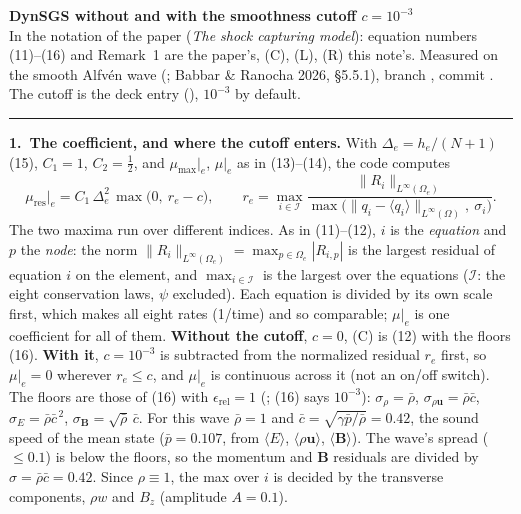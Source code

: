 \documentclass[10pt]{article}
\newcommand{\vv}{\bm{u}}
\newcommand{\BB}{\bm{B}}
\newcommand{\Linf}[2]{\lVert #1\rVert_{L^\infty(#2)}}
\newcommand{\avg}[1]{\langle #1\rangle}
\newcommand{\Ic}{\mathcal{I}}
\newcommand{\erel}{\epsilon_{\mathrm{rel}}}
\newcommand{\mres}{\mu_{\mathrm{res}}\big|_e}
\begin{document}
{\Large\bfseries DynSGS without and with the smoothness cutoff $c=10^{-3}$}\\[2pt]
{\small In the notation of the paper (\emph{The shock capturing model}): equation numbers (11)--(16) and Remark~1 are the
paper's, (C), (L), (R) this note's. Measured on the smooth Alfv\'en wave (;
Babbar \& Ranocha 2026, \S5.5.1), branch \branch{}, commit . The cutoff is the deck entry 
(), $10^{-3}$ by default.}

\vspace{-2pt}\noindent\rule{\textwidth}{0.4pt}

\textbf{1.\ The coefficient, and where the cutoff enters.}
With $\Delta_e=h_e/(N+1)$ (15), $C_1=1$, $C_2=\tfrac12$, and $\mu_{\max}|_e$, $\mu|_e$ as in (13)--(14), the code computes
\begin{equation}
\mres=C_1\,\Delta_e^2\,\max\big(0,\ r_e-c\big),\qquad
r_e=\max_{i\in\Ic}\frac{\Linf{R_i}{\Omega_e}}{\max\big(\Linf{q_i-\avg{q_i}}{\Omega},\ \sigma_i\big)} .
\tag{C}
\end{equation}
The two maxima run over different indices. As in (11)--(12), $i$ is the \emph{equation} and $p$ the \emph{node}: the norm
$\Linf{R_i}{\Omega_e}=\max_{p\in\Omega_e}|R_{i,p}|$ is the largest residual of equation $i$ on the element, and
$\max_{i\in\Ic}$ is the largest over the equations ($\Ic$: the eight conservation laws, $\psi$ excluded). Each equation is divided
by its own scale first, which makes all eight rates (1/time) and so comparable; $\mu|_e$ is one coefficient for all of them.
\textbf{Without the cutoff}, $c=0$, (C) is (12) with the floors (16). \textbf{With it}, $c=10^{-3}$ is subtracted from the
normalized residual $r_e$ first, so $\mu|_e=0$ wherever $r_e\le c$, and $\mu|_e$ is continuous across it (not an on/off
switch). The floors are those of (16) with $\erel=1$ (; (16) says $10^{-3}$):
$\sigma_\rho=\bar\rho$, $\sigma_{\rho\vv}=\bar\rho\bar c$, $\sigma_E=\bar\rho\bar c^{\,2}$, $\sigma_{\BB}=\sqrt{\bar\rho}\,\bar c$.
For this wave $\bar\rho=1$ and $\bar c=\sqrt{\gamma\bar p/\bar\rho}=0.42$, the sound speed of the mean state ($\bar p=0.107$, from
$\avg{E}$, $\avg{\rho\vv}$, $\avg{\BB}$). The wave's spread ($\le0.1$) is below the floors, so the
momentum and $\BB$ residuals are divided by $\sigma=\bar\rho\bar c=0.42$. Since $\rho\equiv1$, the max over $i$ is decided by
the transverse components, $\rho w$ and $B_z$ (amplitude $A=0.1$).
\end{document}
